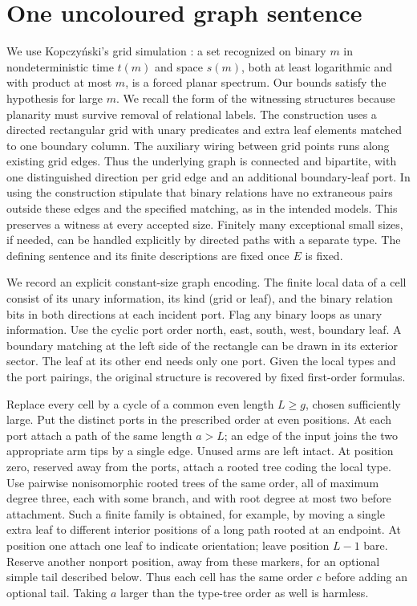 \documentclass[11pt]{article}
\begin{document}
\section{One uncoloured graph sentence}
We use Kopczyński's grid simulation \cite[Corollary 4.1]{grid}: a set recognized on binary $m$ in nondeterministic time $t(m)$ and space $s(m)$, both at least logarithmic and with product at most $m$, is a forced planar spectrum. Our bounds satisfy the hypothesis for large $m$. We recall the form of the witnessing structures because planarity must survive removal of relational labels. The construction uses a directed rectangular grid with unary predicates and extra leaf elements matched to one boundary column. The auxiliary wiring between grid points runs along existing grid edges. Thus the underlying graph is connected and bipartite, with one distinguished direction per grid edge and an additional boundary-leaf port. In using the construction stipulate that binary relations have no extraneous pairs outside these edges and the specified matching, as in the intended models. This preserves a witness at every accepted size. Finitely many exceptional small sizes, if needed, can be handled explicitly by directed paths with a separate type. The defining sentence and its finite descriptions are fixed once $E$ is fixed.

We record an explicit constant-size graph encoding. The finite local data of a cell consist of its unary information, its kind (grid or leaf), and the binary relation bits in both directions at each incident port. Flag any binary loops as unary information. Use the cyclic port order north, east, south, west, boundary leaf. A boundary matching at the left side of the rectangle can be drawn in its exterior sector. The leaf at its other end needs only one port. Given the local types and the port pairings, the original structure is recovered by fixed first-order formulas.

Replace every cell by a cycle of a common even length $L\ge g$, chosen sufficiently large. Put the distinct ports in the prescribed order at even positions. At each port attach a path of the same length $a>L$; an edge of the input joins the two appropriate arm tips by a single edge. Unused arms are left intact. At position zero, reserved away from the ports, attach a rooted tree coding the local type. Use pairwise nonisomorphic rooted trees of the same order, all of maximum degree three, each with some branch, and with root degree at most two before attachment. Such a finite family is obtained, for example, by moving a single extra leaf to different interior positions of a long path rooted at an endpoint. At position one attach one leaf to indicate orientation; leave position $L-1$ bare. Reserve another nonport position, away from these markers, for an optional simple tail described below. Thus each cell has the same order $c$ before adding an optional tail. Taking $a$ larger than the type-tree order as well is harmless.
\end{document}
